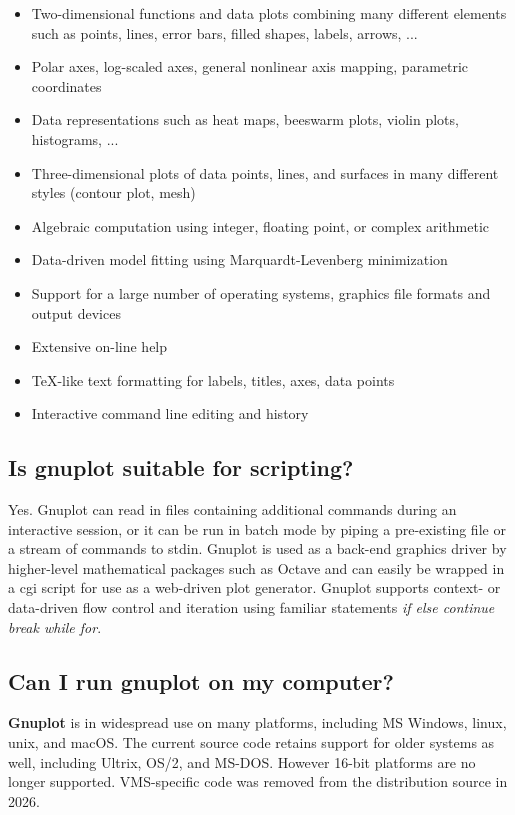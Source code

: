 \documentclass[letter,11pt]{article}
\newcommand{\gnuplot}{\textbf{gnuplot }}
\newcommand{\Gnuplot}{\textbf{Gnuplot }}
\begin{document}
{\begin{itemize}
\item Two-dimensional functions and data plots combining many different
 elements such as points, lines, error bars, filled shapes, labels, arrows, ...
\item Polar axes, log-scaled axes, general nonlinear axis mapping, parametric coordinates
\item Data representations such as heat maps, beeswarm plots, violin plots, histograms, ...
\item Three-dimensional plots of data points, lines, and surfaces in
many different styles (contour plot, mesh)
\item Algebraic computation using integer, floating point, or complex arithmetic
\item Data-driven model fitting using Marquardt-Levenberg minimization
\item Support for a large number of operating systems, graphics
 file formats and output devices
\item Extensive on-line help
\item \TeX{}-like text formatting for labels, titles, axes, data points
\item Interactive command line editing and history
\end{itemize}


\subsection{Is \gnuplot suitable for scripting?}

Yes. Gnuplot can read in files containing additional commands during
an interactive session, or it can be run in batch mode by piping a
pre-existing file or a stream of commands to stdin. Gnuplot is used
as a back-end graphics driver by higher-level mathematical packages
such as Octave and can easily be wrapped in a cgi script for use as a
web-driven plot generator.  Gnuplot supports context- or data-driven
flow control and iteration using familiar statements
{\em if else continue break while for}.


\subsection{Can I run \gnuplot on my computer?}

\Gnuplot{} is in widespread use on many platforms, including
MS Windows, linux, unix, and macOS.  The current source code retains
support for older systems as well, including Ultrix, OS/2, and
MS-DOS. However 16-bit platforms are no longer supported.
VMS-specific code was removed from the distribution source in 2026.

}
\end{document}
